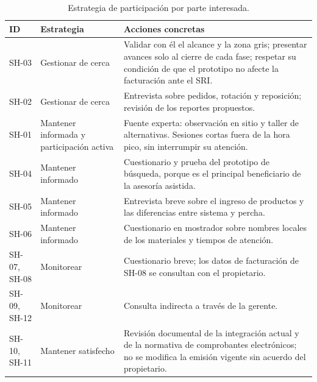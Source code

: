 \begin{table}[H]
\centering
\caption{Estrategia de participación por parte interesada.}
\label{tab:estrategia}
\small
\begin{tabularx}{\textwidth}{@{}L{1.2cm}L{2.4cm}X@{}}
\toprule
\textbf{ID} & \textbf{Estrategia} & \textbf{Acciones concretas} \\
\midrule
SH-03 & Gestionar de cerca & Validar con él el alcance y la zona gris; presentar avances solo al cierre de cada fase; respetar su condición de que el prototipo no afecte la facturación ante el SRI. \\
SH-02 & Gestionar de cerca & Entrevista sobre pedidos, rotación y reposición; revisión de los reportes propuestos. \\
SH-01 & Mantener informada y participación activa & Fuente experta: observación en sitio y taller de alternativas. Sesiones cortas fuera de la hora pico, sin interrumpir su atención. \\
SH-04 & Mantener informado & Cuestionario y prueba del prototipo de búsqueda, porque es el principal beneficiario de la asesoría asistida. \\
SH-05 & Mantener informado & Entrevista breve sobre el ingreso de productos y las diferencias entre sistema y percha. \\
SH-06 & Mantener informado & Cuestionario en mostrador sobre nombres locales de los materiales y tiempos de atención. \\
SH-07, SH-08 & Monitorear & Cuestionario breve; los datos de facturación de SH-08 se consultan con el propietario. \\
SH-09, SH-12 & Monitorear & Consulta indirecta a través de la gerente. \\
SH-10, SH-11 & Mantener satisfecho & Revisión documental de la integración actual y de la normativa de comprobantes electrónicos; no se modifica la emisión vigente sin acuerdo del propietario. \\
\bottomrule
\end{tabularx}
\end{table}
